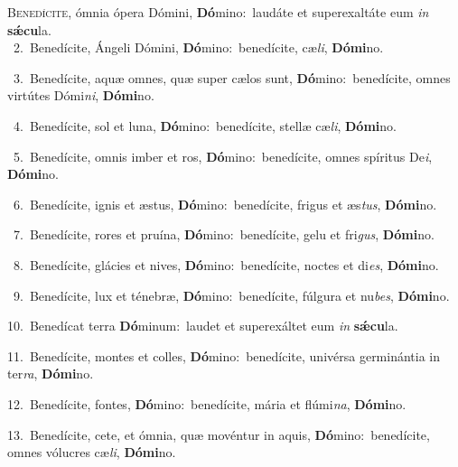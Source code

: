 \lettrine{\initial\textcolor{\initialcolor}{B}}{enedícite,} ómnia ópera Dómini, \textbf{Dó}\-mino:~\star laudáte et superexaltáte eum \textit{in} \textbf{sǽ}\-\textbf{cu}la.\\
{\numbfont\textcolor{\numbcolor}{~2.}}~Benedícite, Ángeli Dómini, \textbf{Dó}\-mino:~\star benedícite, cæ\-\textit{li}\-, \textbf{Dó}\-\textbf{mi}no.\par
{\numbfont\textcolor{\numbcolor}{~3.}}~Benedícite, aquæ omnes, quæ super cælos sunt, \textbf{Dó}\-mino:~\star benedícite, omnes virtútes Dómi\-\textit{ni}\-, \textbf{Dó}\-\textbf{mi}no.\par
{\numbfont\textcolor{\numbcolor}{~4.}}~Benedícite, sol et luna, \textbf{Dó}\-mino:~\star benedícite, stellæ cæ\-\textit{li}\-, \textbf{Dó}\-\textbf{mi}no.\par
{\numbfont\textcolor{\numbcolor}{~5.}}~Benedícite, omnis imber et ros, \textbf{Dó}\-mino:~\star benedícite, omnes spíritus De\-\textit{i}\-, \textbf{Dó}\-\textbf{mi}no.\par
{\numbfont\textcolor{\numbcolor}{~6.}}~Benedícite, ignis et æstus, \textbf{Dó}\-mino:~\star benedícite, frigus et æs\-\textit{tus}\-, \textbf{Dó}\-\textbf{mi}no.\par
{\numbfont\textcolor{\numbcolor}{~7.}}~Benedícite, rores et pruína, \textbf{Dó}\-mino:~\star benedícite, gelu et fri\-\textit{gus}\-, \textbf{Dó}\-\textbf{mi}no.\par
{\numbfont\textcolor{\numbcolor}{~8.}}~Benedícite, glácies et nives, \textbf{Dó}\-mino:~\star benedícite, noctes et di\-\textit{es}\-, \textbf{Dó}\-\textbf{mi}no.\par
{\numbfont\textcolor{\numbcolor}{~9.}}~Benedícite, lux et ténebræ, \textbf{Dó}\-mino:~\star benedícite, fúlgura et nu\-\textit{bes}\-, \textbf{Dó}\-\textbf{mi}no.\par
{\numbfont\textcolor{\numbcolor}{10.}}~Benedícat terra \textbf{Dó}\-minum:~\star laudet et superexáltet eum \textit{in} \textbf{sǽ}\-\textbf{cu}la.\par
{\numbfont\textcolor{\numbcolor}{11.}}~Benedícite, montes et colles, \textbf{Dó}\-mino:~\star benedícite, univérsa germinántia in ter\-\textit{ra}\-, \textbf{Dó}\-\textbf{mi}no.\par
{\numbfont\textcolor{\numbcolor}{12.}}~Benedícite, fontes, \textbf{Dó}\-mino:~\star benedícite, mária et flúmi\-\textit{na}\-, \textbf{Dó}\-\textbf{mi}no.\par
{\numbfont\textcolor{\numbcolor}{13.}}~Benedícite, cete, et ómnia, quæ movéntur in aquis, \textbf{Dó}\-mino:~\star benedícite, omnes vólucres cæ\-\textit{li}\-, \textbf{Dó}\-\textbf{mi}no.\par

